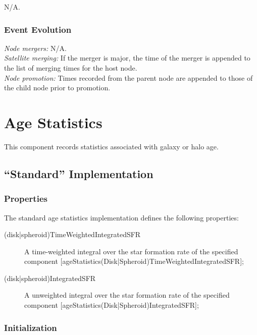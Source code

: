 N/A.

\subsubsection{Event Evolution}

\noindent\emph{Node mergers:} N/A.\\

\noindent\emph{Satellite merging:} If the merger is major, the time of the merger is appended to the list of merging times for the host node.\\

\noindent\emph{Node promotion:} Times recorded from the parent node are appended to those of the child node prior to promotion.\\

\section{Age Statistics}

This \gls{component} records statistics associated with galaxy or halo age.

\subsection{``Standard'' Implementation}

\subsubsection{Properties}

The standard age statistics implementation defines the following properties:
\begin{description}
 \item [{\normalfont \ttfamily (disk|spheroid)TimeWeightedIntegratedSFR}] A time-weighted integral over the star formation rate of the specified component [{\normalfont \ttfamily ageStatistics(Disk|Spheroid)TimeWeightedIntegratedSFR}];
 \item [{\normalfont \ttfamily (disk|spheroid)IntegratedSFR}] A unweighted integral over the star formation rate of the specified component [{\normalfont \ttfamily ageStatistics(Disk|Spheroid)IntegratedSFR}];
\end{description}

\subsubsection{Initialization}

